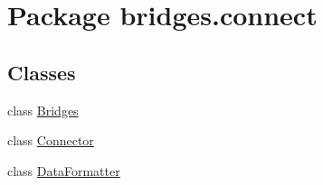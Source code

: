 \hypertarget{namespacebridges_1_1connect}{}\section{Package bridges.\+connect}
\label{namespacebridges_1_1connect}
\subsection*{Classes}
\begin{DoxyCompactItemize}
\item 
class \hyperlink{classbridges_1_1connect_1_1_bridges}{Bridges}
\item 
class \hyperlink{classbridges_1_1connect_1_1_connector}{Connector}
\item 
class \hyperlink{classbridges_1_1connect_1_1_data_formatter}{Data\+Formatter}
\end{DoxyCompactItemize}
